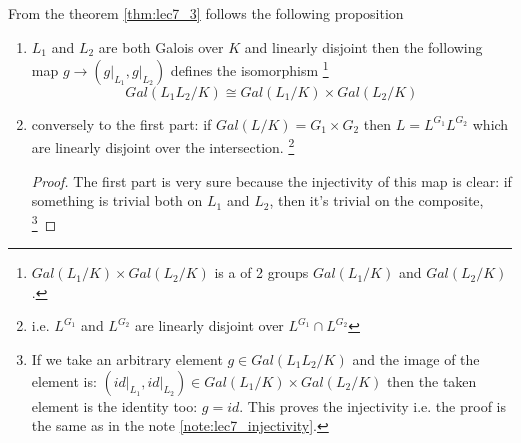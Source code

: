 From the theorem \ref{thm:lec7_3} follows the following proposition
\begin{proposition}
  \begin{enumerate}
  \item $L_1$ and $L_2$ are both Galois over $K$ and linearly disjoint then
    the following map $g \to \left(\left. g \right|_{L_1}, \left. g
    \right|_{L_2}\right)$ defines the isomorphism
    \footnote{
      $Gal\left(L_1/K\right) \times Gal\left(L_2/K\right)$ is a
       of 2 groups
      $Gal\left(L_1/K\right)$ and $Gal\left(L_2/K\right)$.
    }
    \[
    Gal\left(L_1 L_2/K\right) \cong Gal\left(L_1/K\right) \times Gal\left(L_2/K\right)
    \]
  \item conversely to the first part: if
    $Gal\left(L/K\right) = G_1 \times G_2$ then $L = L^{G_1} L^{G_2}$
    which are linearly disjoint over the intersection.
    \footnote{
      i.e. $L^{G_1}$ and $L^{G_2}$ are linearly disjoint over $L^{G_1}
      \cap L^{G_2}$ 
    }
    \begin{proof}
      The first part is very sure because the injectivity of this
      map is clear: if something is trivial both on $L_1$ and $L_2$,
      then  it's trivial on the composite,
      \footnote{
        If we take an arbitrary element
        $g \in Gal\left(L_1 L_2/K\right)$
        and the image of the element is:
        $\left(\left. id \right|_{L_1}, \left. id
        \right|_{L_2}\right) \in Gal\left(L_1/K\right) \times Gal\left(L_2/K\right)$
        then the taken element is the identity
        too: $g = id$. This proves the injectivity i.e. the proof is the same as
        in the note \ref{note:lec7_injectivity}.
        
}
\end{proof}
\end{enumerate}
\end{proposition}
